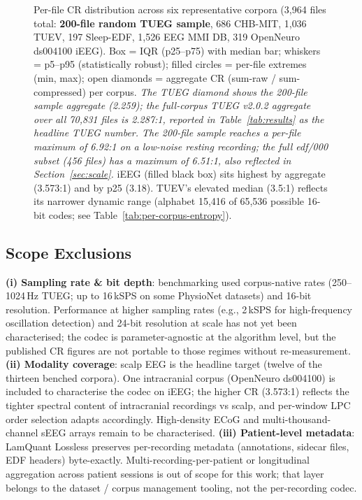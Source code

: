 \documentclass[journal]{IEEEtran}
\begin{document}
\begin{figure}[!t]
\caption{Per-file CR distribution across six representative
corpora (3{,}964 files total: \textbf{200-file random TUEG
sample}, 686 CHB-MIT, 1{,}036 TUEV, 197 Sleep-EDF, 1{,}526 EEG
MMI DB, 319 OpenNeuro ds004100 iEEG). Box = IQR (p25--p75) with
median bar; whiskers = p5--p95 (statistically robust); filled
circles = per-file extremes (min, max); open diamonds = aggregate
CR (sum-raw / sum-compressed) per corpus. \emph{The TUEG diamond
shows the 200-file sample aggregate (2.259); the full-corpus
TUEG v2.0.2 aggregate over all 70{,}831 files is 2.287:1, reported
in Table~\ref{tab:results} as the headline TUEG number. The
200-file sample reaches a per-file maximum of 6.92:1 on a
low-noise resting recording; the full edf/000 subset (456 files)
has a maximum of 6.51:1, also reflected in Section~\ref{sec:scale}.}
iEEG (filled black box) sits highest by aggregate
(3.573:1) and by p25 (3.18). TUEV's elevated median (3.5:1)
reflects its narrower dynamic range (alphabet 15{,}416 of 65{,}536
possible 16-bit codes; see Table~\ref{tab:per-corpus-entropy}).}
\label{fig:per-file-cr}
\end{figure}

\subsection{Scope Exclusions}
\textbf{(i) Sampling rate \& bit depth}: benchmarking used
corpus-native rates (250--1024\,Hz TUEG; up to 16\,kSPS on some
PhysioNet datasets) and 16-bit resolution. Performance at
higher sampling rates (e.g., 2\,kSPS for high-frequency oscillation
detection) and 24-bit resolution at scale has not yet been
characterised; the codec is parameter-agnostic at the algorithm
level, but the published CR figures are not portable to those
regimes without re-measurement.
\textbf{(ii) Modality coverage}: scalp EEG is the headline target
(twelve of the thirteen benched corpora). One intracranial corpus
(OpenNeuro ds004100) is included to characterise the codec on
iEEG; the higher CR (3.573:1) reflects the tighter spectral
content of intracranial recordings vs scalp, and per-window LPC
order selection adapts accordingly. High-density ECoG and
multi-thousand-channel sEEG arrays remain to be characterised.
\textbf{(iii) Patient-level metadata}: LamQuant Lossless preserves
per-recording metadata (annotations, sidecar files, EDF headers)
byte-exactly. Multi-recording-per-patient or longitudinal
aggregation across patient sessions is out of scope for this work;
that layer belongs to the dataset / corpus management tooling, not
the per-recording codec.
\end{document}
